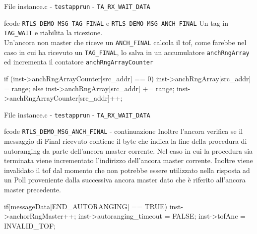 \begin{frame}[fragile]{File instance.c - \lstinline[language=C]!testapprun! - \lstinline[language=C]!TA_RX_WAIT_DATA!}
  \begin{block}{fcode \lstinline[language=C]!RTLS_DEMO_MSG_TAG_FINAL! e \lstinline[language=C]!RTLS_DEMO_MSG_ANCH_FINAL!}
    Un tag in \lstinline[language=C]!TAG_WAIT! e riabilita la ricezione.\\
    Un'ancora non master che riceve un \lstinline[language=C]!ANCH_FINAL! calcola il tof, come
    farebbe nel caso in cui ha ricevuto un \lstinline[language=C]!TAG_FINAL!, lo salva in un accumulatore
    \lstinline[language=C]!anchRngArray! ed incrementa il contatore \lstinline[language=C]!anchRngArrayCounter!
    \begin{C}
      if (inst->anchRngArrayCounter[src_addr] == 0)
        inst->anchRngArray[src_addr] = range;
      else 
        inst->anchRngArray[src_addr] += range;
      inst->anchRngArrayCounter[src_addr]++;
    \end{C}
  \end{block}
\end{frame}

\begin{frame}[fragile]{File instance.c - \lstinline[language=C]!testapprun! - \lstinline[language=C]!TA_RX_WAIT_DATA!}
  \begin{block}{fcode \lstinline[language=C]!RTLS_DEMO_MSG_ANCH_FINAL! - continuazione}
    Inoltre l'ancora verifica se il messaggio di Final ricevuto contiene
    il byte che indica la fine della procedura di autoranging da parte dell'ancora
    master corrente. Nel caso in cui la procedura sia terminata viene incrementato
    l'indirizzo dell'ancora master corrente. Inoltre \alert{viene invalidato} il tof
    dal momento che non potrebbe essere utilizzato nella risposta ad un Poll proveniente
    dalla successiva ancora master dato che è riferito all'ancora master precedente.
    \begin{C}
      if(messageData[END_AUTORANGING] == TRUE)
      {
        inst->anchorRngMaster++;
        inst->autoranging_timeout = FALSE;
        inst->tofAnc = INVALID_TOF;
      }
    \end{C}
  \end{block}
\end{frame}

